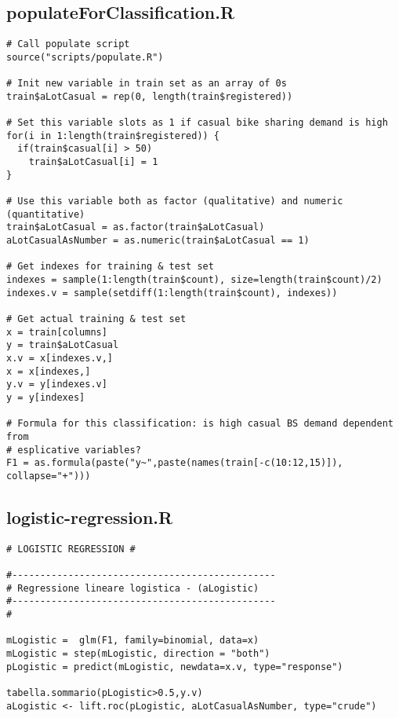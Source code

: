 \subsection{populateForClassification.R}\label{sec:script-populate-class}
\begin{verbatim}
# Call populate script
source("scripts/populate.R")

# Init new variable in train set as an array of 0s
train$aLotCasual = rep(0, length(train$registered))

# Set this variable slots as 1 if casual bike sharing demand is high
for(i in 1:length(train$registered)) {
  if(train$casual[i] > 50)
    train$aLotCasual[i] = 1
}

# Use this variable both as factor (qualitative) and numeric (quantitative)
train$aLotCasual = as.factor(train$aLotCasual)
aLotCasualAsNumber = as.numeric(train$aLotCasual == 1)

# Get indexes for training & test set
indexes = sample(1:length(train$count), size=length(train$count)/2)
indexes.v = sample(setdiff(1:length(train$count), indexes))

# Get actual training & test set
x = train[columns]
y = train$aLotCasual
x.v = x[indexes.v,]
x = x[indexes,]
y.v = y[indexes.v]
y = y[indexes]

# Formula for this classification: is high casual BS demand dependent from
# esplicative variables?
F1 = as.formula(paste("y~",paste(names(train[-c(10:12,15)]), collapse="+")))
\end{verbatim}

\subsection{logistic-regression.R}\label{sec:script-log-reg}
\begin{verbatim}
# LOGISTIC REGRESSION #

#-----------------------------------------------
# Regressione lineare logistica - (aLogistic)
#-----------------------------------------------
#

mLogistic =  glm(F1, family=binomial, data=x)
mLogistic = step(mLogistic, direction = "both")
pLogistic = predict(mLogistic, newdata=x.v, type="response")

tabella.sommario(pLogistic>0.5,y.v)
aLogistic <- lift.roc(pLogistic, aLotCasualAsNumber, type="crude")
\end{verbatim}
